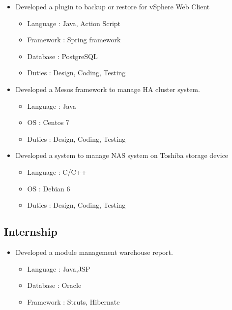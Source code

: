 \documentclass[12pt,a4paper,sans]{moderncv} %
\begin{document}
{\begin{itemize}
\item Developed a plugin to backup or restore for vSphere Web Client
  \begin{itemize}
    \item Language : Java, Action Script
		\item Framework : Spring framework
    \item Database : PostgreSQL
		\item Duties : Design, Coding, Testing
  \end{itemize}
\end{itemize}
}
{\begin{itemize}
\item Developed a Mesos framework to manage HA cluster system.
  \begin{itemize}
    \item Language : Java
    \item OS : Centos 7
		\item Duties : Design, Coding, Testing
  \end{itemize}
\end{itemize}
}
{\begin{itemize}
\item Developed a system to manage NAS system on Toshiba storage device
  \begin{itemize}
    \item Language : C/C++
    \item OS : Debian 6
		\item Duties : Design, Coding, Testing
  \end{itemize}
\end{itemize}
}
\subsection{Internship}
{\begin{itemize}
\item Developed a module management warehouse report.
  \begin{itemize}
    \item Language : Java,JSP
    \item Database : Oracle
    \item Framework : Struts, Hibernate
  \end{itemize}
\end{itemize}
}
\end{document}
